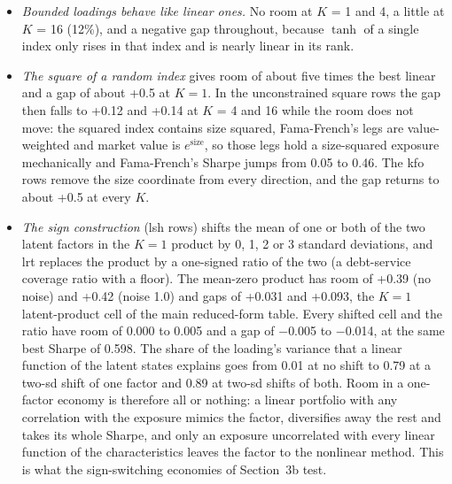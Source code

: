 \documentclass[11pt]{article}
\begin{document}
\begin{itemize}
\item \emph{Bounded loadings behave like linear ones.} No room at $K$ = 1 and 4, a little at $K$ = 16 (12\%), and a negative gap throughout, because $\tanh$ of a single index only rises in that index and is nearly linear in its rank.
\item \emph{The square of a random index} gives room of about five times the best linear and a gap of about +0.5 at $K = 1$. In the unconstrained square rows the gap then falls to +0.12 and +0.14 at $K$ = 4 and 16 while the room does not move: the squared index contains size squared, Fama-French's legs are value-weighted and market value is $e^{\mathrm{size}}$, so those legs hold a size-squared exposure mechanically and Fama-French's Sharpe jumps from 0.05 to 0.46. The kfo rows remove the size coordinate from every direction, and the gap returns to about +0.5 at every $K$.
\item \emph{The sign construction} (lsh rows) shifts the mean of one or both of the two latent factors in the $K = 1$ product by 0, 1, 2 or 3 standard deviations, and lrt replaces the product by a one-signed ratio of the two (a debt-service coverage ratio with a floor). The mean-zero product has room of +0.39 (no noise) and +0.42 (noise 1.0) and gaps of +0.031 and +0.093, the $K = 1$ latent-product cell of the main reduced-form table. Every shifted cell and the ratio have room of 0.000 to 0.005 and a gap of $-$0.005 to $-$0.014, at the same best Sharpe of 0.598. The share of the loading's variance that a linear function of the latent states explains goes from 0.01 at no shift to 0.79 at a two-sd shift of one factor and 0.89 at two-sd shifts of both. Room in a one-factor economy is therefore all or nothing: a linear portfolio with any correlation with the exposure mimics the factor, diversifies away the rest and takes its whole Sharpe, and only an exposure uncorrelated with every linear function of the characteristics leaves the factor to the nonlinear method. This is what the sign-switching economies of Section~3b test.
\end{itemize}
\end{document}
